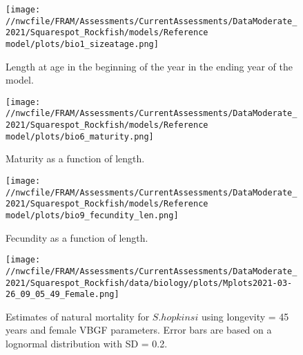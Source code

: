 \documentclass[11pt,
  english,
  a4paper,
]{article}
\begin{document}
\tagmcend\tagstructend


\begin{figure}
\centering
\texttt{[image: //nwcfile/FRAM/Assessments/CurrentAssessments/DataModerate\_2021/Squarespot\_Rockfish/models/Reference model/plots/bio1\_sizeatage.png]}
\caption{Length at age in the beginning of the year in the ending year of the model.\label{fig:len-age-ss}}
\end{figure}

\tagmcend\tagstructend


\begin{figure}
\centering
\texttt{[image: //nwcfile/FRAM/Assessments/CurrentAssessments/DataModerate\_2021/Squarespot\_Rockfish/models/Reference model/plots/bio6\_maturity.png]}
\caption{Maturity as a function of length.\label{fig:maturity}}
\end{figure}

\tagmcend\tagstructend


\begin{figure}
\centering
\texttt{[image: //nwcfile/FRAM/Assessments/CurrentAssessments/DataModerate\_2021/Squarespot\_Rockfish/models/Reference model/plots/bio9\_fecundity\_len.png]}
\caption{Fecundity as a function of length.\label{fig:fecundity}}
\end{figure}

\tagmcend\tagstructend


\begin{figure}
\centering
\texttt{[image: //nwcfile/FRAM/Assessments/CurrentAssessments/DataModerate\_2021/Squarespot\_Rockfish/data/biology/plots/Mplots2021-03-26\_09\_05\_49\_Female.png]}
\caption{Estimates of natural mortality for {\(S. hopkinsi\)\leavevmode\tagmcend\tagstructend} using longevity = 45 years and female VBGF parameters. Error bars are based on a lognormal distribution with SD = 0.2.\label{fig:M_female}}
\end{figure}
\end{document}
